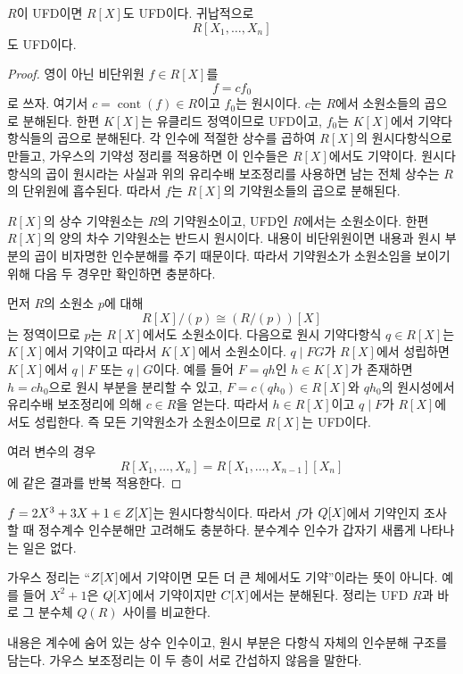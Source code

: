 \begin{corollary}[가우스 정리]
$R$이 UFD이면 $R[X]$도 UFD이다. 귀납적으로
\[
  R[X_1,\dots,X_n]
\]
도 UFD이다.
\end{corollary}

\begin{proof}
영이 아닌 비단위원 $f\in R[X]$를
\[
  f=c f_0
\]
로 쓰자. 여기서 $c=\operatorname{cont}(f)\in R$이고 $f_0$는 원시이다. $c$는 $R$에서 소원소들의 곱으로 분해된다. 한편 $K[X]$는 유클리드 정역이므로 UFD이고, $f_0$는 $K[X]$에서 기약다항식들의 곱으로 분해된다. 각 인수에 적절한 상수를 곱하여 $R[X]$의 원시다항식으로 만들고, 가우스의 기약성 정리를 적용하면 이 인수들은 $R[X]$에서도 기약이다. 원시다항식의 곱이 원시라는 사실과 위의 유리수배 보조정리를 사용하면 남는 전체 상수는 $R$의 단위원에 흡수된다. 따라서 $f$는 $R[X]$의 기약원소들의 곱으로 분해된다.

$R[X]$의 상수 기약원소는 $R$의 기약원소이고, UFD인 $R$에서는 소원소이다. 한편 $R[X]$의 양의 차수 기약원소는 반드시 원시이다. 내용이 비단위원이면 내용과 원시 부분의 곱이 비자명한 인수분해를 주기 때문이다. 따라서 기약원소가 소원소임을 보이기 위해 다음 두 경우만 확인하면 충분하다.

먼저 $R$의 소원소 $p$에 대해
\[
  R[X]/(p)\cong(R/(p))[X]
\]
는 정역이므로 $p$는 $R[X]$에서도 소원소이다. 다음으로 원시 기약다항식 $q\in R[X]$는 $K[X]$에서 기약이고 따라서 $K[X]$에서 소원소이다. $q\mid FG$가 $R[X]$에서 성립하면 $K[X]$에서 $q\mid F$ 또는 $q\mid G$이다. 예를 들어 $F=qh$인 $h\in K[X]$가 존재하면 $h=c h_0$으로 원시 부분을 분리할 수 있고, $F=c(qh_0)\in R[X]$와 $qh_0$의 원시성에서 유리수배 보조정리에 의해 $c\in R$을 얻는다. 따라서 $h\in R[X]$이고 $q\mid F$가 $R[X]$에서도 성립한다. 즉 모든 기약원소가 소원소이므로 $R[X]$는 UFD이다.

여러 변수의 경우
\[
  R[X_1,\dots,X_n]
  =R[X_1,\dots,X_{n-1}][X_n]
\]
에 같은 결과를 반복 적용한다.
\end{proof}

\begin{example}
$f=2X^3+3X+1\in Z[X]$는 원시다항식이다. 따라서 $f$가 $Q[X]$에서 기약인지 조사할 때 정수계수 인수분해만 고려해도 충분하다. 분수계수 인수가 갑자기 새롭게 나타나는 일은 없다.
\end{example}

\begin{pitfall}
가우스 정리는 ``$Z[X]$에서 기약이면 모든 더 큰 체에서도 기약''이라는 뜻이 아니다. 예를 들어 $X^2+1$은 $Q[X]$에서 기약이지만 $C[X]$에서는 분해된다. 정리는 UFD $R$과 바로 그 분수체 $Q(R)$ 사이를 비교한다.
\end{pitfall}

\begin{keyidea}
내용은 계수에 숨어 있는 상수 인수이고, 원시 부분은 다항식 자체의 인수분해 구조를 담는다. 가우스 보조정리는 이 두 층이 서로 간섭하지 않음을 말한다.
\end{keyidea}

